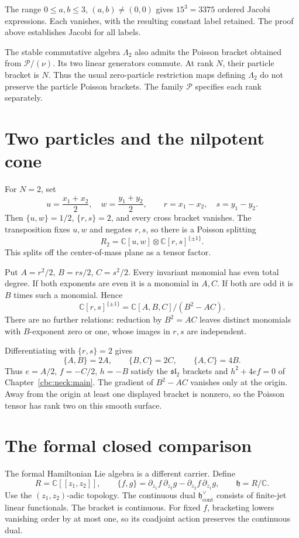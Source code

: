 The range $0\leq a,b\leq3$, $(a,b)\ne(0,0)$ gives $15^3=3375$
ordered Jacobi expressions.  Each vanishes, with the resulting constant
label retained.  The proof above establishes Jacobi for all labels.

The stable commutative algebra $\Lambda_2$ also admits the Poisson bracket
obtained from $\mathcal P/(\nu)$.  Its two linear generators commute.
At rank $N$, their particle bracket is $N$.  Thus the usual zero-particle
restriction maps defining $\Lambda_2$ do not preserve the particle Poisson
brackets.  The family $\mathcal P$ specifies each rank separately.

\section{Two particles and the nilpotent cone}
For $N=2$, set
\[
 u=\frac{x_1+x_2}{2},\quad w=\frac{y_1+y_2}{2},\qquad
 r=x_1-x_2,\quad s=y_1-y_2.
\]
Then $\{u,w\}=1/2$, $\{r,s\}=2$, and every cross bracket vanishes.
The transposition fixes $u,w$ and negates $r,s$, so there is a Poisson
splitting
\[
 R_2=\mathbb C[u,w]\otimes\mathbb C[r,s]^{\{\pm1\}}.
\]
This splits off the center-of-mass plane as a tensor factor.

Put $A=r^2/2$, $B=rs/2$, $C=s^2/2$.  Every invariant monomial has even
total degree.  If both exponents are even it is a monomial in $A,C$.
If both are odd it is $B$ times such a monomial.  Hence
\[
 \mathbb C[r,s]^{\{\pm1\}}
 =\mathbb C[A,B,C]/(B^2-AC).
\]
There are no further relations: reduction by $B^2=AC$ leaves distinct
monomials with $B$-exponent zero or one, whose images in $r,s$ are independent.

Differentiating with $\{r,s\}=2$ gives
\[
 \{A,B\}=2A,\qquad\{B,C\}=2C,\qquad\{A,C\}=4B.
\]
Thus $e=A/2$, $f=-C/2$, $h=-B$ satisfy the
$\mathfrak{sl}_2$ brackets and $h^2+4ef=0$ of
Chapter~\ref{cbc:neck:main}.  The gradient of $B^2-AC$ vanishes only at the
origin.  Away from the origin at least one displayed bracket is nonzero,
so the Poisson tensor has rank two on this smooth surface.

\section{The formal closed comparison}
The formal Hamiltonian Lie algebra is a different carrier.  Define
\[
 R=\mathbb C[[z_1,z_2]],\qquad
 \{f,g\}=\partial_{z_1}f\,\partial_{z_2}g
         -\partial_{z_2}f\,\partial_{z_1}g,
 \qquad\mathfrak h=R/\mathbb C.
\]
Use the $(z_1,z_2)$-adic topology.  The continuous dual
$\mathfrak h^\vee_{\mathrm{cont}}$ consists of finite-jet linear functionals.
The bracket is continuous.  For fixed $f$, bracketing lowers vanishing
order by at most one, so its coadjoint action preserves the continuous dual.

